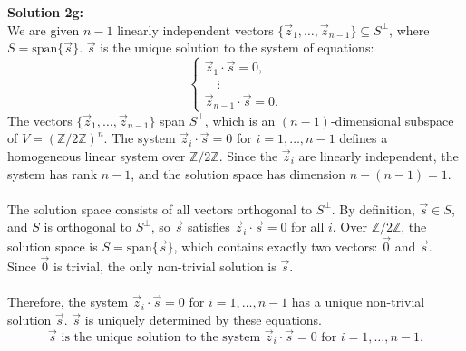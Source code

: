\documentclass{article}
\begin{document}
\textbf{Solution 2g:}\\
We are given \( n-1 \) linearly independent vectors \( \{\vec{z}_1, \ldots, \vec{z}_{n-1}\} \subseteq S^\perp \), where \( S = \text{span}\{\vec{s}\} \).  \( \vec{s} \) is the unique solution to the system of equations:
\[
\begin{cases}
\vec{z}_1 \cdot \vec{s} = 0, \\
\quad \vdots \\
\vec{z}_{n-1} \cdot \vec{s} = 0.
\end{cases}
\]
The vectors \( \{\vec{z}_1, \ldots, \vec{z}_{n-1}\} \) span \( S^\perp \), which is an \((n-1)\)-dimensional subspace of \( V = (\mathbb{Z}/2\mathbb{Z})^n \). The system \( \vec{z}_i \cdot \vec{s} = 0 \) for \( i = 1, \ldots, n-1 \) defines a homogeneous linear system over \( \mathbb{Z}/2\mathbb{Z} \). Since the \( \vec{z}_i \) are linearly independent, the system has rank \( n-1 \), and the solution space has dimension \( n - (n-1) = 1 \).\\
\\
The solution space consists of all vectors orthogonal to \( S^\perp \). By definition, \( \vec{s} \in S \), and \( S \) is orthogonal to \( S^\perp \), so \( \vec{s} \) satisfies \( \vec{z}_i \cdot \vec{s} = 0 \) for all \( i \). Over \( \mathbb{Z}/2\mathbb{Z} \), the solution space is \( S = \text{span}\{\vec{s}\} \), which contains exactly two vectors: \( \vec{0} \) and \( \vec{s} \). Since \( \vec{0} \) is trivial, the only non-trivial solution is \( \vec{s} \).\\
\\
Therefore, the system \( \vec{z}_i \cdot \vec{s} = 0 \) for \( i = 1, \ldots, n-1 \) has a unique non-trivial solution \( \vec{s} \). \( \vec{s} \) is uniquely determined by these equations.
\[
\boxed{\vec{s} \text{ is the unique solution to the system } \vec{z}_i \cdot \vec{s} = 0 \text{ for } i = 1, \ldots, n-1.}
\]
\end{document}
